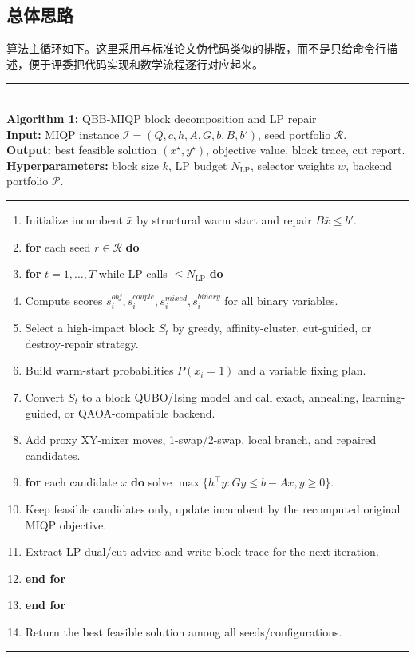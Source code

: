 \documentclass[UTF8,a4paper,11pt]{ctexart}
\begin{document}
\subsection{总体思路}

算法主循环如下。这里采用与标准论文伪代码类似的排版，而不是只给命令行描述，便于评委把代码实现和数学流程逐行对应起来。

{\small
\noindent\rule{\linewidth}{0.4pt}\\[-0.6em]
\textbf{Algorithm 1:} QBB-MIQP block decomposition and LP repair\\
\textbf{Input:} MIQP instance $\mathcal{I}=(Q,c,h,A,G,b,B,b')$, seed portfolio $\mathcal{R}$.\\
\textbf{Output:} best feasible solution $(x^\star,y^\star)$, objective value, block trace, cut report.\\
\textbf{Hyperparameters:} block size $k$, LP budget $N_{\mathrm{LP}}$, selector weights $w$, backend portfolio $\mathcal{P}$.\\[-0.2em]
\noindent\rule{\linewidth}{0.4pt}
\begin{enumerate}[label=\arabic*.,leftmargin=2.2em,itemsep=0.1em,topsep=0.2em]
  \item Initialize incumbent $\bar{x}$ by structural warm start and repair $B\bar{x}\le b'$.
  \item \textbf{for} each seed $r\in\mathcal{R}$ \textbf{do}
  \item \quad \textbf{for} $t=1,\ldots,T$ while LP calls $\le N_{\mathrm{LP}}$ \textbf{do}
  \item \quad\quad Compute scores $s_i^{obj},s_i^{couple},s_i^{mixed},s_i^{binary}$ for all binary variables.
  \item \quad\quad Select a high-impact block $S_t$ by greedy, affinity-cluster, cut-guided, or destroy-repair strategy.
  \item \quad\quad Build warm-start probabilities $P(x_i=1)$ and a variable fixing plan.
  \item \quad\quad Convert $S_t$ to a block QUBO/Ising model and call exact, annealing, learning-guided, or QAOA-compatible backend.
  \item \quad\quad Add proxy XY-mixer moves, 1-swap/2-swap, local branch, and repaired candidates.
  \item \quad\quad \textbf{for} each candidate $x$ \textbf{do} solve $\max\{h^\top y:Gy\le b-Ax,y\ge0\}$.
  \item \quad\quad Keep feasible candidates only, update incumbent by the recomputed original MIQP objective.
  \item \quad\quad Extract LP dual/cut advice and write block trace for the next iteration.
  \item \quad \textbf{end for}
  \item \textbf{end for}
  \item Return the best feasible solution among all seeds/configurations.
\end{enumerate}
\noindent\rule{\linewidth}{0.4pt}
}
\end{document}

